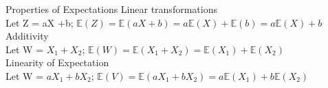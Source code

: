 \documentclass[aspectratio=169]{../latex_main/tntbeamer}  %
\begin{document}
	
	\begin{frame}{Properties of Expectations}
	      Linear transformations\\
          Let Z = aX +b;\hspace{2cm} $\mathbb{E}(Z) = \mathbb{E}(aX + b) = a\mathbb{E}(X) + \mathbb{E}(b) = a\mathbb{E}(X) + b$ \\
          \bigskip
          Additivity\\
          Let W = $X_1 + X_2$;\hspace{2cm} $\mathbb{E}(W) = \mathbb{E}(X_1 + X_2) = \mathbb{E}(X_1) + \mathbb{E}(X_2)$ \\
          \bigskip
	      Linearity of Expectation\\
	      Let W = $aX_1 + bX_2$;\hspace{2cm} $\mathbb{E}(V) = \mathbb{E}(aX_1 + bX_2) = a\mathbb{E}(X_1) + b\mathbb{E}(X_2)$ \\
            
	  
	\end{frame}
	
\end{document}
